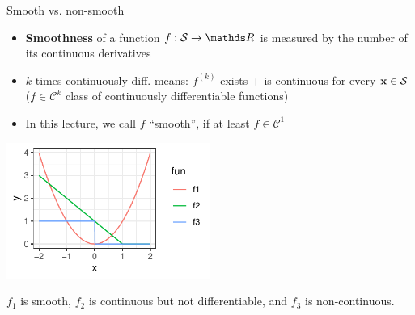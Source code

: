 \documentclass[11pt,compress,t,notes=noshow, xcolor=table]{beamer}
\begin{document}
\begin{vbframe}{Smooth vs. non-smooth}

\begin{itemize}
\item \textbf{Smoothness} of a function  $f: \mathcal{S} \to \R$ is measured by the number of its continuous derivatives
\item $k$-times continuously diff. means: $f^{(k)}$ exists + is continuous for every $\mathbf{x} \in \mathcal{S}$\\
($f \in \mathcal{C}^k$ class of continuously differentiable functions) 
\item In this lecture, we call $f$ \enquote{smooth}, if at least $f \in \mathcal{C}^1$
\end{itemize}


\begin{center}
\includegraphics[width = 0.5\textwidth]{figure_man/hinge_vs_l2.pdf} \\ 
\begin{footnotesize}
$f_1$ is smooth, $f_2$ is continuous but not differentiable, and $f_3$ is non-continuous. 
\end{footnotesize}
\end{center}


\end{vbframe}
\end{document}
